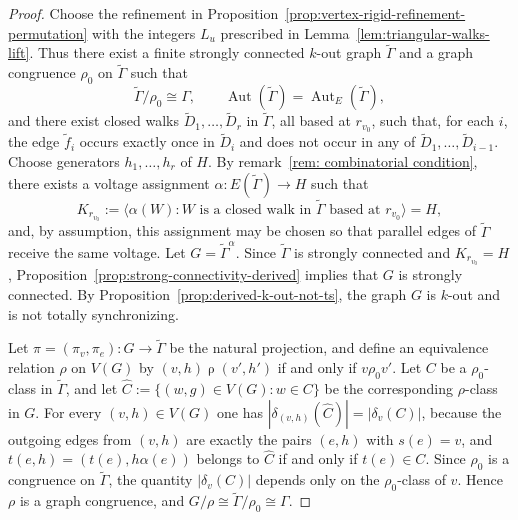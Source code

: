 \documentclass[a4paper,10pt]{amsart}
\theoremstyle{plain}
\theoremstyle{definition}
\DeclareMathOperator{\Aut}{Aut}
\begin{document}
\begin{proof}
Choose the refinement in
Proposition~\ref{prop:vertex-rigid-refinement-permutation}
with the integers $L_u$ prescribed in
Lemma~\ref{lem:triangular-walks-lift}.
Thus there exist a finite strongly connected $k$-out graph
$\widetilde\Gamma$ and a graph congruence $\rho_0$ on
$\widetilde\Gamma$ such that
\[
\widetilde\Gamma/\rho_0\cong\Gamma,
\qquad
\Aut(\widetilde\Gamma)=\Aut_E(\widetilde\Gamma),
\]
and there exist closed walks
$\widetilde D_1,\dots,\widetilde D_r$ in $\widetilde\Gamma$, all based
at $r_{v_0}$, such that, for each $i$, the edge $\widetilde f_i$ occurs exactly once in $\widetilde D_i$ and does not occur in any of
$\widetilde D_1,\dots,\widetilde D_{i-1}$.
Choose generators $h_1,\dots,h_r$ of $H$. By remark~\ref{rem: combinatorial condition}, there exists a voltage assignment $\alpha:E(\widetilde\Gamma)\to H$ such that
\[
K_{r_{v_0}}:=\langle \alpha(W): W \text{ is a closed walk in }\widetilde\Gamma\text{ based at }r_{v_0}\rangle = H,
\]
and, by assumption, this assignment may be chosen so that parallel edges of $\widetilde\Gamma$ receive the same voltage. Let $G=\widetilde\Gamma^\alpha$. Since $\widetilde\Gamma$ is strongly connected and $K_{r_{v_0}}=H$, Proposition~\ref{prop:strong-connectivity-derived} implies that $G$ is strongly connected. By Proposition~\ref{prop:derived-k-out-not-ts}, the graph $G$ is $k$-out and is not totally synchronizing.

Let $\pi=(\pi_v,\pi_e):G\to \widetilde\Gamma$ be the natural projection, and define an equivalence relation $\rho$ on $V(G)$ by $(v,h)\mathrel{\rho}(v',h')$ if and only if $v\mathrel{\rho_0}v'$. Let $C$ be a $\rho_0$-class in $\widetilde\Gamma$, and let $\widehat C:=\{(w,g)\in V(G): w\in C\}$ be the corresponding $\rho$-class in $G$. For every $(v,h)\in V(G)$ one has $|\delta_{(v,h)}(\widehat C)|=|\delta_v(C)|$, because the outgoing edges from $(v,h)$ are exactly the pairs $(e,h)$ with $s(e)=v$, and $t(e,h)=(t(e),h\alpha(e))$ belongs to $\widehat C$ if and only if $t(e)\in C$. Since $\rho_0$ is a congruence on $\widetilde\Gamma$, the quantity $|\delta_v(C)|$ depends only on the $\rho_0$-class of $v$. Hence $\rho$ is a graph congruence, and $G/\rho\cong \widetilde\Gamma/\rho_0\cong \Gamma$.


\end{proof}
\end{document}
